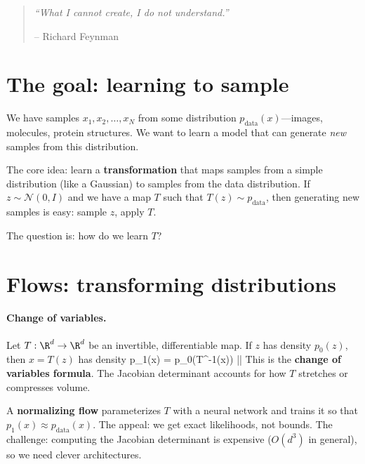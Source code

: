 \documentclass[11pt]{article}
\begin{document}
\thispagestyle{plain}

\newcommand{\genicon}{$x \sim p(x)$}

\chapterheading{\genicon\hspace{0.4em}$\cdot$ Generative Models}

\vspace{1em}
\begin{quote}
\textit{``What I cannot create, I do not understand.''}

\raggedleft-- Richard Feynman
\end{quote}
\vspace{0.5em}

\section{The goal: learning to sample}

We have samples $x_1, x_2, \ldots, x_N$ from some distribution $p_{\text{data}}(x)$---images, molecules, protein structures. We want to learn a model that can generate \emph{new} samples from this distribution.

The core idea: learn a \textbf{transformation} that maps samples from a simple distribution (like a Gaussian) to samples from the data distribution. If $z \sim \mathcal{N}(0, I)$ and we have a map $T$ such that $T(z) \sim p_{\text{data}}$, then generating new samples is easy: sample $z$, apply $T$.

The question is: how do we learn $T$?

\section{Flows: transforming distributions}

\paragraph{Change of variables.} Let $T: \R^d \to \R^d$ be an invertible, differentiable map. If $z$ has density $p_0(z)$, then $x = T(z)$ has density
\beq
p_1(x) = p_0(T^{-1}(x)) \left|\det {}\right|
\eeq
This is the \textbf{change of variables formula}. The Jacobian determinant accounts for how $T$ stretches or compresses volume.

A \textbf{normalizing flow} parameterizes $T$ with a neural network and trains it so that $p_1(x) \approx p_{\text{data}}(x)$. The appeal: we get exact likelihoods, not bounds. The challenge: computing the Jacobian determinant is expensive ($O(d^3)$ in general), so we need clever architectures.
\end{document}
